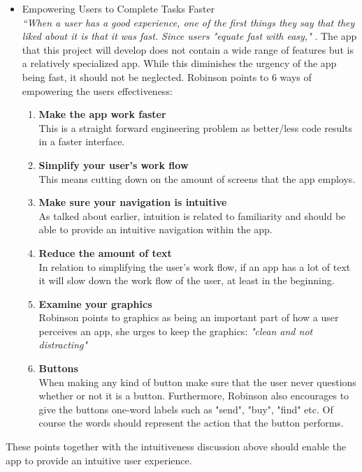 \begin{itemize}
\item  Empowering Users to Complete Tasks Faster\\
 \textit{“When a user has a good experience, one of the first things they say 
 that they liked about it is that it was fast. Since users "equate fast with 
 easy," }.\cite{UXKeys} The app that this project will develop does not contain a 
 wide range of features but is a relatively specialized app. While this 
 diminishes the urgency of the app being fast, it should not be neglected. \label{EvalConFast}
 Robinson points to 6 ways of empowering the users effectiveness\cite{UXKeys}:
 \begin{enumerate}
 \item \textbf{Make the app work faster}\\
 This is a straight forward engineering problem as better/less code results in a 
 faster interface. 
 \item \textbf{Simplify your user's work flow}\\
  This means cutting down on the amount of screens that the app employs.
 \item \textbf{Make sure your navigation is intuitive}\\\label{effectivenessP3}
 As talked about earlier, intuition is related to familiarity and should be able to provide an 
 intuitive navigation within the app.
 \item \textbf{Reduce the amount of text}\\
 In relation to simplifying the user's work flow, if an app has a lot of text it will slow down 
 the work flow of the user, at least in the beginning.
 \item \textbf{Examine your graphics}\\
 Robinson points to graphics as being an important part of how a user perceives 
 an app, she urges to keep the graphics: \textit{"clean and not distracting"} 
 \item \textbf{Buttons}\\
 When making any kind of button make sure that the user never questions whether 
 or not it is a button. Furthermore, Robinson also encourages to give the buttons one-word labels such as "send", "buy", "find" etc. Of course the words should 
 represent the action that the button performs.
 \end{enumerate} 
\end{itemize} 
These points together with the intuitiveness discussion above should enable the 
app to provide an intuitive user experience. 


